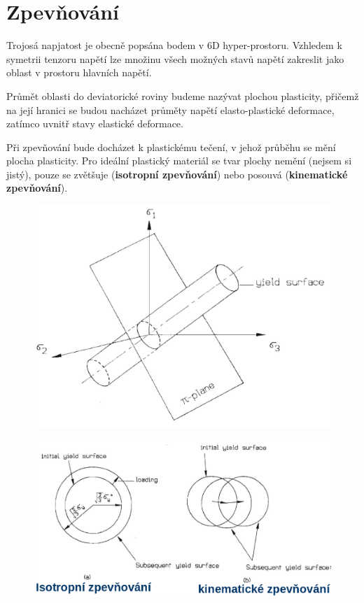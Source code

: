 \documentclass{article}
\begin{document}
	\section{Zpevňování}
	Trojosá napjatost je obecně popsána bodem v 6D hyper-prostoru. Vzhledem k symetrii tenzoru napětí lze množinu všech možných stavů napětí zakreslit jako oblast v prostoru hlavních napětí.

	Průmět oblasti do deviatorické roviny budeme nazývat plochou plasticity, přičemž na její hranici se budou nacházet průměty napětí elasto-plastické deformace, zatímco uvnitř stavy elastické deformace.

	Při zpevňování bude docházet k plastickému tečení, v jehož průběhu se mění plocha plasticity. Pro ideální plastický materiál se tvar plochy nemění (nejsem si jistý), pouze se zvětšuje (\textbf{isotropní zpevňování}) nebo posouvá (\textbf{kinematické zpevňování}).
	\begin{figure}[h!]
		\centering
		\includegraphics[width=.5\linewidth]{figs/PlochaPlasticity.png}
	\end{figure}
	\begin{figure}[h!]
		\centering
		\includegraphics[width=.5\linewidth]{figs/Zpevnovani.png}
	\end{figure}
\end{document}
